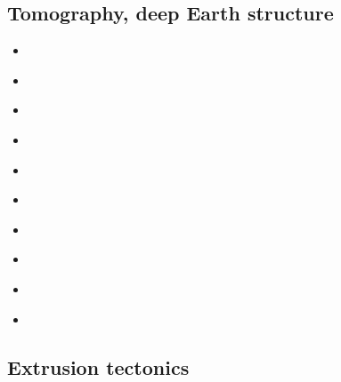 \subsection{Tomography, deep Earth structure}
\begin{scriptsize}
\begin{itemize}
\item[\nineteeneightyone] 
\textcite{dzan81} \\
\item[\nineteenninetyone] 
\textcite{spak91} \\
\item[\nineteenninetythree] 
\textcite{kara93} \\
\item[\twothousandnine] 
\textcite{scbr09} \\
\item[\twothousandthree] 
\textcite{pimo03} \\
\item[\twothousandten] 
\textcite{sifb10} \\ 
\item[\twothousandeleven]
\textcite{ridv11} \\
\item[\twothousandthirteen] 
\textcite{fopa13} \\ 
\item[\twothousandsixteen] 
\textcite{moek16} \\
\item[\twothousandeighteen] 
\textcite{homs18} \\
\end{itemize}
\end{scriptsize}


\subsection{Extrusion tectonics}


